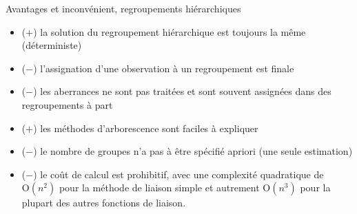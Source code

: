 \documentclass[
  ignorenonframetext,
]{beamer}
\providecommand{\tightlist}{%
  \setlength{\itemsep}{0pt}\setlength{\parskip}{0pt}}\usepackage{longtable,booktabs,array}
\begin{document}
\begin{frame}{Avantages et inconvénient, regroupements hiérarchiques}
\protect\hypertarget{avantages-et-inconvuxe9nient-regroupements-hiuxe9rarchiques}{}
\begin{itemize}
\tightlist
\item
  (\(+\)) la solution du regroupement hiérarchique est toujours la même
  (déterministe)
\item
  (\(-\)) l'assignation d'une observation à un regroupement est finale
\item
  (\(-\)) les aberrances ne sont pas traitées et sont souvent assignées
  dans des regroupements à part
\item
  (\(+\)) les méthodes d'arborescence sont faciles à expliquer
\item
  (\(-\)) le nombre de groupes n'a pas à être spécifié apriori (une
  seule estimation)
\item
  (\(-\)) le coût de calcul est prohibitif, avec une complexité
  quadratique de \(\mathrm{O}(n^2)\) pour la méthode de liaison simple
  et autrement \(\mathrm{O}(n^3)\) pour la plupart des autres fonctions
  de liaison.
\end{itemize}
\end{frame}
\end{document}
